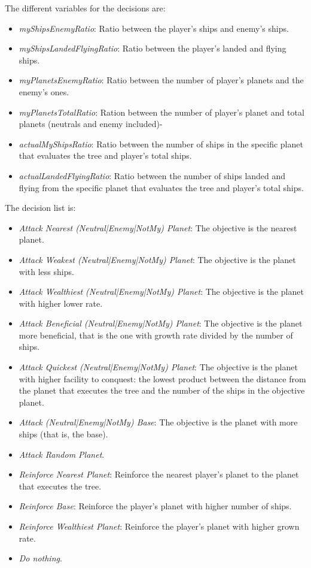 The different variables for the decisions are:

\begin{itemize}
\item {\em myShipsEnemyRatio}: Ratio between the player's ships and enemy's ships.
\item {\em myShipsLandedFlyingRatio}: Ratio between the player's landed and flying ships.
\item {\em myPlanetsEnemyRatio}: Ratio between the number of player's planets and the enemy's ones.
\item {\em myPlanetsTotalRatio}: Ration between the number of player's planet and total planets (neutrals and enemy included)-
\item {\em actualMyShipsRatio}: Ratio between the number of ships in the specific planet that evaluates the tree and player's total ships.
\item {\em actualLandedFlyingRatio}: Ratio between the number of ships landed and flying from the specific planet that evaluates the tree and player's total ships.
\end{itemize}

The decision list is:

\begin{itemize}
\item {\em Attack Nearest (Neutral|Enemy|NotMy) Planet}: The objective is the nearest planet.
\item {\em Attack Weakest (Neutral|Enemy|NotMy) Planet}: The objective is the planet with less ships.
\item {\em Attack Wealthiest (Neutral|Enemy|NotMy) Planet}: The objective is the planet with higher lower rate.
\item {\em Attack Beneficial (Neutral|Enemy|NotMy) Planet}: The objective is the planet more beneficial, that is the one with growth rate divided by the number of ships.
\item {\em Attack Quickest (Neutral|Enemy|NotMy) Planet}: The objective is the planet with higher facility to conquest: the lowest product between the distance from the planet that executes the tree and the number of the ships in the objective planet.
\item {\em Attack (Neutral|Enemy|NotMy) Base}: The objective is the planet with more ships (that is, the base).
\item {\em  Attack Random Planet}.
\item {\em Reinforce Nearest Planet}: Reinforce the nearest player's planet to the planet that executes the tree.
\item {\em Reinforce Base}: Reinforce the player's planet with higher number of ships.
\item {\em Reinforce Wealthiest Planet}: Reinforce the player's planet with higher grown rate.
\item {\em Do nothing}.


\end{itemize}

